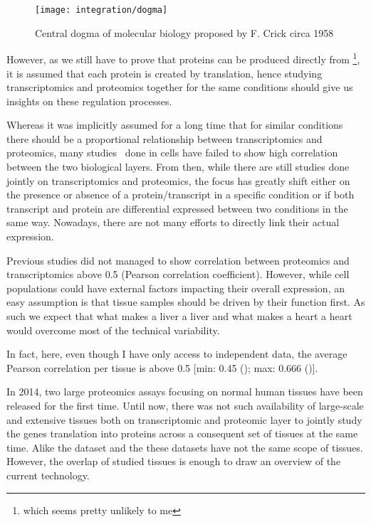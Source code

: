\begin{figure}[!htbp]
    \texttt{[image: integration/dogma]}\centering
    \caption{\label{dogma}Central dogma of molecular biology proposed by F. Crick
    circa 1958}
\end{figure}

However, as we still have to prove that proteins can be produced directly
from \DNA\footnote{which seems pretty unlikely to me}, it is assumed that
each protein is created by translation, hence studying
transcriptomics and proteomics together for the same conditions should give us
insights on these regulation processes.

Whereas it was implicitly assumed for a long time that for similar conditions
there should be a proportional relationship between transcriptomics and
proteomics, many studies\
done in cells have failed to show high correlation between the two biological
layers. From then, while there are still studies done jointly on transcriptomics
and proteomics, the focus has greatly shift either on the presence or absence of
a protein/transcript in a specific condition or if both transcript and protein
are differential expressed between two conditions in the same way.
Nowadays, there are not many efforts to directly link their actual expression.

Previous studies did not managed to show correlation between proteomics and
transcriptomics above 0.5 (Pearson correlation coefficient).
However, while cell populations could have external factors impacting their
overall expression, an easy assumption is that tissue samples should be driven
by their function first. As such we expect that what makes a liver a liver and
what makes a heart a heart would overcome most of the technical variability.

In fact, here, even though I have only access to independent data, the average
Pearson correlation per tissue is above 0.5
[min: 0.45 (); max: 0.666 ()].

In 2014, two large proteomics assays focusing on normal human tissues have been
released for the first time.
Until now, there was not such availability of large-scale and extensive tissues
both on transcriptomic and proteomic layer to jointly study the genes
translation into proteins across a consequent set of tissues
at the same time. Alike the  dataset and the 
these datasets have not the same scope of tissues. However, the overlap of
studied tissues is enough to draw an overview of the current technology.


